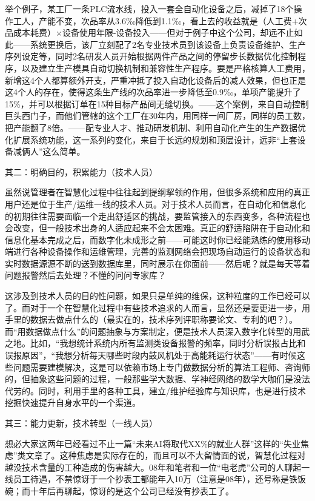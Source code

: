\documentclass[]{book}
\begin{document}
举个例子，某工厂一条PLC流水线，投入一套全自动化设备之后，减掉了18个操作工人，产能不变，次品率从3.6‰降低到1.1‰，看上去的收益就是（人工费+次品成本耗费）×设备使用年限-设备投入------但对于例子中这个公司，却远不止如此------系统更换后，该厂立刻配了2名专业技术员到该设备上负责设备维护、生产序列设定等，同时2名研发人员开始根据两件产品之间的停留步长数据优化控制程序，以及建立生产模具自动切换机制和兼容性生产程序。要是严格核算人工费用，新增这4个人都算额外开支，严重冲抵了投入自动化设备后的减人效果，但也正是这4个人的存在，使得这条生产线的次品率进一步降低至0.9‰，单项产能提升了15\%，并可以根据订单在15种目标产品间无缝切换。------这个案例，来自自动控制巨头西门子，而他们管辖的这个工厂在30年内，用同样一间厂房，同样的员工数，把产能翻了8倍。------配专业人才、推动研发机制、利用自动化产生的生产数据优化扩展系统功能，这一系列的变化，来自于长远的规划和顶层设计，远非``上套设备减俩人''这么简单。

其二：明确目的，积累能力（技术人员）

虽然说管理者在智慧化过程中往往起到提纲挈领的作用，但很多系统和应用的真正用户还是位于生产/运维一线的技术人员。对于技术人员而言，在自动化和信息化的初期往往需要面临一个走出舒适区的挑战，要监管接入的东西变多，各种流程也会改变，但一般技术出身的人适应起来不会太困难。真正的舒适陷阱在于自动化和信息化基本完成之后，而数字化未成形之前------可能这时你已经能熟练的使用移动端进行各种设备操作和运维管理，完善的监测网络会把现场自动运行的设备状态和实时数据源源不断的送到数据库里，同时展示在你面前------然后呢？就是每天等着问题报警然后去处理？不懂的问问专家库？

这涉及到技术人员的目的性问题，如果只是单纯的维保，这种粒度的工作已经可以了。而对于一个在智慧化过程中有些技术追求的人而言，显然还是要更进一步，用手里的数据去做点什么的（最实在的，技术序列评职称要论文、专利的吧？）。而``用数据做点什么''的问题抽象与方案制定，便是技术人员深入数字化转型的用武之地。比如，``我想统计系统内所有监测类设备报警的频率，同时分析误报占比和误报原因''，``我想分析每天哪些时段内鼓风机处于高能耗运行状态''------有时候这些问题需要建模解决，这是可以依赖市场上专门做数据分析的算法工程师、咨询师的，但抽象这些问题的过程，一般那些学大数据、学神经网络的数学大咖们是没法代劳的。同时，利用手里的各种工具，建立/维护经验库与知识库，也是进行技术挖掘快速提升自身水平的一个渠道。

其三：能力更新，技术转型（一线人员）

想必大家这两年已经看过不止一篇``未来AI将取代XX\%的就业人群''这样的``失业焦虑''类文章了。这种焦虑是实际存在的，而且可以不大留情面的说，智慧化过程对越没技术含量的工种造成的伤害越大。08年和笔者和一位``电老虎''公司的人聊起一线员工待遇，不禁惊讶于一个抄表工都能年入10万（注意是08年），还号称是铁饭碗；而十年后再聊起，惊讶的是这个公司已经没有抄表工了。
\end{document}
